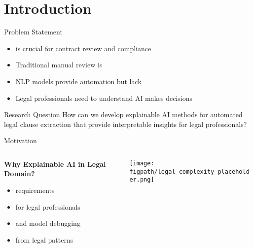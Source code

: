 
\section{Introduction}

\begin{frame}{Problem Statement}
\begin{itemize}
    \item {} is crucial for contract review and compliance
    \item Traditional manual review is 
    \item NLP models provide automation but lack 
    \item Legal professionals need to understand  AI makes decisions
\end{itemize}

\vspace{0.5cm}
\begin{alertblock}{Research Question}
How can we develop explainable AI methods for automated legal clause extraction that provide interpretable insights for legal professionals?
\end{alertblock}
\end{frame}

\begin{frame}{Motivation}
\begin{columns}
\begin{column}{0.6\textwidth}
\textbf{Why Explainable AI in Legal Domain?}
\begin{itemize}
    \item {} requirements
    \item {} for legal professionals
    \item {} and model debugging
    \item {} from legal patterns
\end{itemize}
\end{column}
\begin{column}{0.4\textwidth}
\begin{center}
\texttt{[image: \\figpath/legal\_complexity\_placeholder.png]}
\end{center}
\end{column}
\end{columns}
\end{frame}

